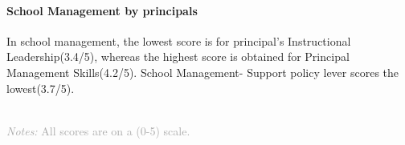\documentclass[twocolumn]{article}
\let\oldparagraph\paragraph
\renewcommand{\paragraph}[1]{\oldparagraph{#1}\mbox{}}
\begin{document}
\begin{table}[H]
\end{table}

\hypertarget{school-management-by-principals}{%
\paragraph{\texorpdfstring{\textbf{School Management by
principals}}{School Management by principals}}\label{school-management-by-principals}}

In school management, the lowest score is for principal's Instructional
Leadership(3.4/5), whereas the highest score is obtained for Principal
Management Skills(4.2/5). School Management- Support policy lever scores
the lowest(3.7/5).

\begin{table}[H]
\\
{\scriptsize
    \textcolor{darkgray}{\textit{Notes:} All scores are on a (0-5) scale.}
  }

\end{table}
\end{document}
